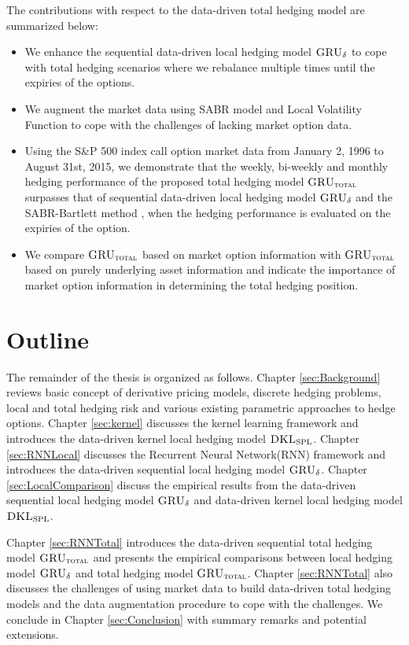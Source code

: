 \documentclass[letterpaper,12pt,titlepage,oneside,final]{book}
\numberwithin{equation}{section}
\theoremstyle{definition}
\newcommand{\model}{\textsc{GRU}_\delta}
\newcommand{\modelT}{\textsc{GRU}_{\textsc{total}}}
\newcommand{\DKLs}{\bf\textsc{DKL}_{\text{SPL}}}
\begin{document}
The contributions with respect to the data-driven total hedging model \cite{knian2020} are summarized below:
\begin{itemize}
	\item  We enhance the sequential data-driven local hedging model $\model$ \cite{knian2019} to cope with total hedging scenarios where we rebalance multiple times until the expiries of the options.
	\item  We augment the market data using SABR model and Local Volatility Function to cope with the challenges of lacking market option data.
	\item  Using the S\&P 500 index call option market data from January 2, 1996 to  August 31st, 2015, we demonstrate that the weekly, bi-weekly and monthly hedging performance of the proposed total hedging model $\modelT$  surpasses that of sequential data-driven local hedging model $\model$ \cite{knian2019} and the SABR-Bartlett method \cite{bartlett2006hedging}, when the hedging performance is evaluated on the expiries of the option.
	\item We compare  $\modelT$ based on market option information with $\modelT$ based on purely underlying asset information and indicate the importance of  market option information in determining the total hedging position.
\end{itemize}
\section{Outline}
The remainder of the thesis is organized as follows.
Chapter \ref{sec:Background}  reviews basic concept of derivative pricing models, discrete hedging problems, local and total hedging risk and various existing parametric approaches to hedge options.
Chapter \ref{sec:kernel}  discusses the kernel learning framework and introduces the data-driven kernel local hedging model $\DKLs$. 
Chapter \ref{sec:RNNLocal} discusses the Recurrent Neural Network(RNN) framework and introduces the data-driven sequential local hedging model $\model$.
Chapter \ref{sec:LocalComparison} discuss the  empirical results  from  the data-driven sequential local hedging model $\model$ and data-driven kernel local hedging model $\DKLs$.

Chapter \ref{sec:RNNTotal} introduces the data-driven sequential total hedging model $\modelT$ and presents the empirical comparisons between local hedging model $\model$ and total hedging model $\modelT$.
Chapter \ref{sec:RNNTotal}  also discusses the challenges of using market data to build data-driven total hedging models and the data augmentation procedure to cope with the challenges.
We conclude in Chapter \ref{sec:Conclusion}  with summary remarks and potential extensions.
\end{document}
